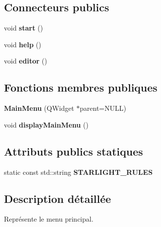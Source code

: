 \subsection*{Connecteurs publics}
\begin{DoxyCompactItemize}
\item 
\hypertarget{classMainMenu_af13a5defbd470cb18edc59d14668aaf4}{void {\bfseries start} ()}\label{classMainMenu_af13a5defbd470cb18edc59d14668aaf4}

\item 
\hypertarget{classMainMenu_aea2e199d621268d691f1aebb7a8f2e31}{void {\bfseries help} ()}\label{classMainMenu_aea2e199d621268d691f1aebb7a8f2e31}

\item 
\hypertarget{classMainMenu_adbce95d3c2192a684d25e6bf2417f073}{void {\bfseries editor} ()}\label{classMainMenu_adbce95d3c2192a684d25e6bf2417f073}

\end{DoxyCompactItemize}
\subsection*{Fonctions membres publiques}
\begin{DoxyCompactItemize}
\item 
\hypertarget{classMainMenu_a15507d68640fd9651dae4a6e3cf9b870}{{\bfseries Main\+Menu} (Q\+Widget $\ast$parent=N\+U\+L\+L)}\label{classMainMenu_a15507d68640fd9651dae4a6e3cf9b870}

\item 
\hypertarget{classMainMenu_a4b83847fe6109626f6dd4404c8afe4b2}{void {\bfseries display\+Main\+Menu} ()}\label{classMainMenu_a4b83847fe6109626f6dd4404c8afe4b2}

\end{DoxyCompactItemize}
\subsection*{Attributs publics statiques}
\begin{DoxyCompactItemize}
\item 
static const std\+::string {\bfseries S\+T\+A\+R\+L\+I\+G\+H\+T\+\_\+\+R\+U\+L\+E\+S}
\end{DoxyCompactItemize}


\subsection{Description détaillée}
Représente le menu principal. 

